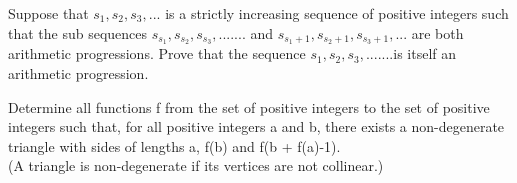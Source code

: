 \item Suppose that $s_1, s_2, s_3, . . .$ is a strictly increasing sequence of positive integers such that the sub sequences $s_{s_1}, s_{s_2}, s_{s_3},.......$ and $s_{s_1+1}, s_{s_2+1}, s_{s_3+1}, . . .$ are both arithmetic progressions. Prove that the sequence $s_1, s_2, s_3,.......$is itself an arithmetic progression.

\item Determine all functions f from the set of positive integers to the set of positive integers such that, for all positive integers a and b, there exists a non-degenerate triangle with sides of lengths
a, f(b) and f(b + f(a)-1).\\
(A triangle is non-degenerate if its vertices are not collinear.)
